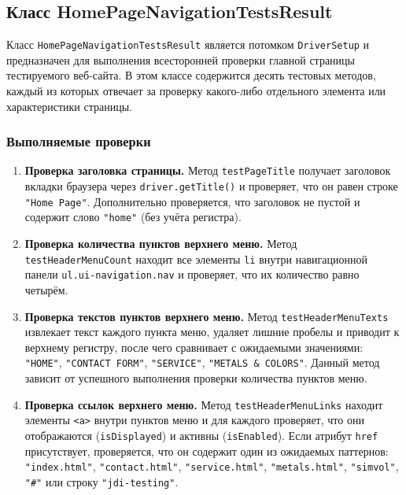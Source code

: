 \documentclass{article}[14pt]
\begin{document}
\subsection{Класс HomePageNavigationTestsResult}

Класс \texttt{HomePageNavigationTestsResult} является потомком \texttt{DriverSetup} и предназначен для выполнения всесторонней проверки 
главной страницы тестируемого веб-сайта. В этом классе содержится десять тестовых методов, каждый из которых отвечает за проверку какого-либо 
отдельного элемента или характеристики страницы.

\subsubsection{Выполняемые проверки}

\begin{enumerate}

\item \textbf{Проверка заголовка страницы.} Метод \texttt{testPageTitle} получает заголовок вкладки браузера через \texttt{driver.getTitle()} и проверяет, что он равен строке \texttt{"Home Page"}. Дополнительно проверяется, что заголовок не пустой и содержит слово \texttt{"home"} (без учёта регистра).

\item \textbf{Проверка количества пунктов верхнего меню.} Метод \texttt{testHeaderMenuCount} находит все элементы \texttt{li} внутри навигационной панели \texttt{ul.ui-navigation.nav} и проверяет, что их количество равно четырём.

\item \textbf{Проверка текстов пунктов верхнего меню.} Метод \texttt{testHeaderMenuTexts} извлекает текст каждого пункта меню, удаляет лишние пробелы и приводит к верхнему регистру, после чего сравнивает с ожидаемыми значениями: \texttt{"HOME"}, \texttt{"CONTACT FORM"}, \texttt{"SERVICE"}, \texttt{"METALS \& COLORS"}. Данный метод зависит от успешного выполнения проверки количества пунктов меню.

\item \textbf{Проверка ссылок верхнего меню.} Метод \texttt{testHeaderMenuLinks} находит элементы \texttt{<a>} внутри пунктов меню и для каждого проверяет, что они отображаются (\texttt{isDisplayed}) и активны (\texttt{isEnabled}). Если атрибут \texttt{href} присутствует, проверяется, что он содержит один из ожидаемых паттернов: \texttt{"index.html"}, \texttt{"contact.html"}, \texttt{"service.html"}, \texttt{"metals.html"}, \texttt{"simvol"}, \texttt{"\#"} или строку \texttt{"jdi-testing"}.


\end{enumerate}
\end{document}
